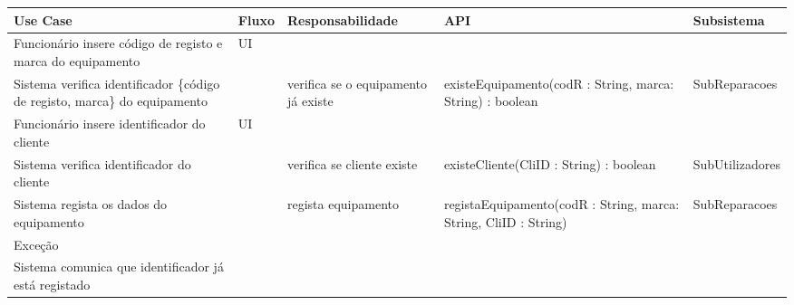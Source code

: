 \documentclass[../relatorio.tex]{subfiles}
\begin{document}
\begin{landscape}
    \begin{table}[!h]
        \centering
        \begin{tabular}{|p{5cm}|p{1cm}|p{4cm}|p{6cm}|p{3cm}|}
            \hline
            \rowcolor{gray!20!white}
            Use Case & Fluxo                                            & Responsabilidade & API & Subsistema \\
            \hline
            \rowcolor{yellow}
            Funcionário insere código de registo e marca do equipamento
                     & UI
                     & 
                     & 
                     & 
            \\
            \hline
            Sistema verifica identificador \{código de registo, marca\} do equipamento
                     & 
                     & verifica se o equipamento já existe
                     & existeEquipamento(codR : String, marca: String) : boolean
                     & SubReparacoes
            \\
            \hline
            \rowcolor{yellow}
            Funcionário insere identificador do cliente
                     & UI
                     & 
                     & 
                     & 
            \\
            \hline
            Sistema verifica identificador do cliente %
                     & 
                     & verifica se cliente existe
                     & existeCliente(CliID : String) : boolean
                     & SubUtilizadores
            \\
            \hline
            Sistema regista os dados do equipamento
                     & 
                     & regista equipamento
                     & registaEquipamento(codR : String, marca: String, CliID : String)
                     & SubReparacoes
            \\
            \hline
            \rowcolor{red!30}
            Exceção  &                                                  &                  &     &            \\
            \hline
            Sistema comunica que identificador já está registado
                     & 
                     & 
                     & 
                     & 
            \\
            \hline
        \end{tabular}
    \end{table}
\end{landscape}
\end{document}
